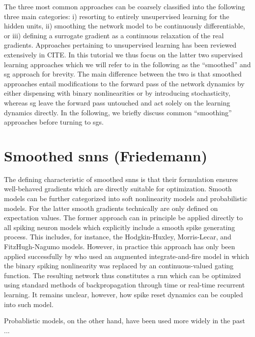 \documentclass[journal,onecolumn,11pt]{IEEEtran}
\begin{document}
The three most common approaches can be coarsely classified into the following three main categories:
i) resorting to entirely unsupervised learning for the hidden units,
ii) smoothing the network model to be continuously differentiable,
or iii) defining a surrogate gradient as a continuous relaxation of the real gradients.
Approaches pertaining to unsupervised learning has been reviewed extensively in CITE. %
In this tutorial we thus focus on the latter two supervised learning approaches which we will refer to in the following as the ``smoothed'' and \gls{sg} approach for brevity. The main difference between the two is that smoothed approaches entail modifications to the forward pass of the network dynamics by either dispensing with binary nonlinearities or by introducing stochasticity, whereas \gls{sg} leave the forward pass untouched and act solely on the learning dynamics directly. In the following, we briefly discuss common ``smoothing'' approaches before turning to \glspl{sg}.


\section{Smoothed \glspl{snn} (Friedemann)}

The defining characteristic of smoothed \glspl{snn} is that their formulation ensures well-behaved gradients which are directly suitable for optimization. 
Smooth models can be further categorized into soft nonlinearity models and 
probabilistic models. For the latter smooth gradients technically are only defined on expectation values. 
The former approach can in principle be applied directly to all spiking neuron models which explicitly include a smooth spike generating process. This includes, for instance,  the Hodgkin-Huxley, Morris-Lecar, and FitzHugh-Nagumo models. 
However, in practice this approach has only been applied successfully by \cite{Huh_Sejnowski17_graddesc} who used an augmented integrate-and-fire model in which the binary spiking nonlinearity was replaced by an continuous-valued gating function. 
The resulting network thus constitutes a \gls{rnn} which can be optimized using standard methods of backpropagation through time or real-time recurrent learning.
It remains unclear, however, how spike reset dynamics can be coupled into such model.

Probablistic models, on the other hand, have been used more widely in the past ...

% 
\end{document}
